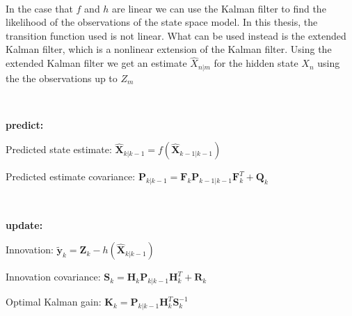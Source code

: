 \begin{center}
\end{center}
\ 
 
 In the case that $f$ and $h$ are linear we can use the Kalman filter to find the likelihood of the observations of the state space model. In this thesis, the transition function used is not linear. What can be used instead is the extended Kalman filter, which is a nonlinear extension of the Kalman filter. Using the extended Kalman filter we get an estimate $\hat{X}_{n|m}$ for the hidden state $X_n$ using the the observations up to $Z_m$


\

\textbf{predict:}

Predicted state estimate: $\bm{\hat X}_{k|k-1} = f(\bm{\hat X}_{k-1|k-1} )$

Predicted estimate covariance: $\textbf{P}_{k|k-1} = \textbf{F}_k\textbf{P}_{k-1|k-1} \textbf{F}_k^T + \textbf{Q}_k$

\

\textbf{update:}

Innovation: $\bm{\tilde y}_{k} = \textbf{Z}_k - h(\bm{\hat X}_{k|k-1})$

Innovation covariance: $\textbf{S}_k = \textbf{H}_k \textbf{P}_{k|k-1}\textbf{H}_k^T + \textbf{R}_k$

Optimal Kalman gain: $\textbf{K}_k = \textbf{P}_{k|k-1} \textbf{H}_k^T \textbf{S}_k^{-1}$

